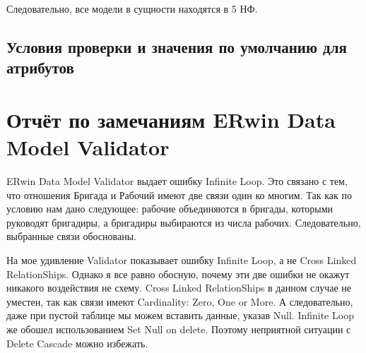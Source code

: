 Следовательно, все модели в сущности находятся в 5 НФ.

\subsection{Условия проверки и значения по умолчанию для атрибутов}


\section {Отчёт по замечаниям ERwin Data Model Validator}

ERwin Data Model Validator выдает ошибку Infinite Loop.
Это связано с тем, что отношения Бригада и Рабочий имеют две связи один ко многим.
Так как по условию нам дано следующее: рабочие объединяются в бригады, которыми руководят бригадиры, а бригадиры выбираются из числа рабочих.
Следовательно, выбранные связи обоснованы.

На мое удивление Validator показывает ошибку Infinite Loop, а не Cross Linked RelationShips.
Однако я все равно обосную, почему эти две ошибки не окажут никакого воздействия не схему.
Cross Linked RelationShips в данном случае не уместен, так как связи имеют Cardinality: Zero, One or More.
А следовательно, даже при пустой таблице мы можем вставить данные, указав Null.
Infinite Loop же обошел использованием Set Null on delete.
Поэтому неприятной ситуации с Delete Cascade можно избежать.

